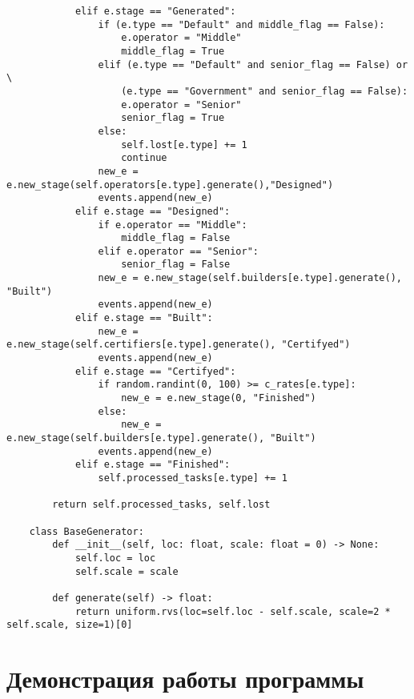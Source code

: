 \clearpage

\begin{lstlisting}
			elif e.stage == "Generated":
				if (e.type == "Default" and middle_flag == False):
					e.operator = "Middle"
					middle_flag = True
				elif (e.type == "Default" and senior_flag == False) or \
					(e.type == "Government" and senior_flag == False):
					e.operator = "Senior"
					senior_flag = True
				else:
					self.lost[e.type] += 1
					continue
				new_e = e.new_stage(self.operators[e.type].generate(),"Designed")
				events.append(new_e)	
			elif e.stage == "Designed":
				if e.operator == "Middle":
					middle_flag = False
				elif e.operator == "Senior":
					senior_flag = False
				new_e = e.new_stage(self.builders[e.type].generate(), "Built")
				events.append(new_e)
			elif e.stage == "Built":
				new_e = e.new_stage(self.certifiers[e.type].generate(),	"Certifyed")
				events.append(new_e)
			elif e.stage == "Certifyed":
				if random.randint(0, 100) >= c_rates[e.type]:
					new_e = e.new_stage(0, "Finished")
				else:
					new_e = e.new_stage(self.builders[e.type].generate(), "Built")
				events.append(new_e)
			elif e.stage == "Finished":
				self.processed_tasks[e.type] += 1
			
		return self.processed_tasks, self.lost

	class BaseGenerator:
		def __init__(self, loc: float, scale: float = 0) -> None:
			self.loc = loc
			self.scale = scale
	
		def generate(self) -> float:
			return uniform.rvs(loc=self.loc - self.scale, scale=2 * self.scale, size=1)[0]
\end{lstlisting}


\clearpage

\section*{Демонстрация работы программы}

\clearpage







